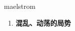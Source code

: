 
\begin{frame}
{\huge maelstrom}
\begin{center}
\begin{enumerate}\Large
  \item \textbf{混乱、动荡的局势}
\end{enumerate}
\end{center}
\end{frame}
